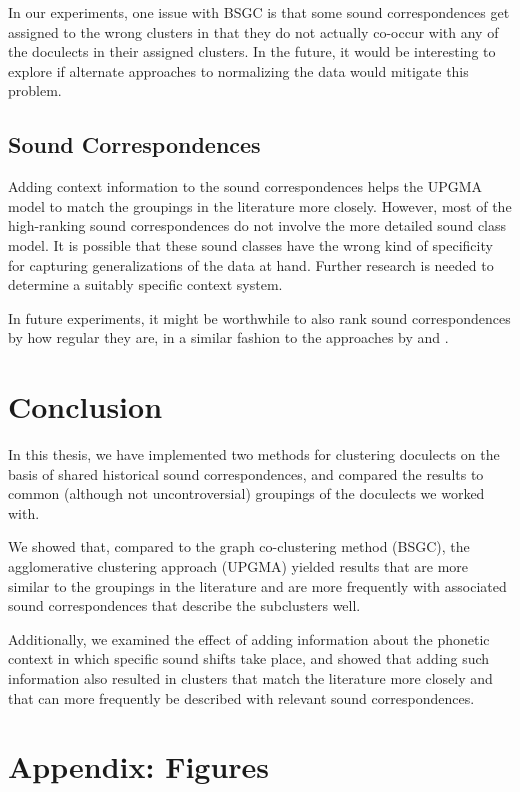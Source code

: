 \documentclass[a4paper, 11pt]{article}
\begin{document}
In our experiments, one issue with BSGC is that some
sound correspondences get assigned to the wrong clusters
in that they do not actually co-occur with any of the
doculects in their assigned clusters.
In the future, it would be interesting to
explore if alternate approaches to normalizing the data
would mitigate this problem.

\subsection{Sound Correspondences}

Adding context information to the sound correspondences
helps the UPGMA model to match the groupings in the literature more closely.
However, most of the high-ranking sound correspondences
do not involve the more detailed sound class model.
It is possible that these sound classes have the wrong kind of specificity for capturing generalizations of the data at hand.
Further research is needed to determine a suitably specific context system.

In future experiments, it might be worthwhile to also rank
sound correspondences by how regular they are,
in a similar fashion to the approaches by
\citet{prokic2007identifying} and \citet{prokic2013combining}.

\section{Conclusion}

In this thesis, we have implemented two methods
for clustering doculects on the basis of shared
historical sound correspondences,
and compared the results to common (although not uncontroversial)
groupings of the doculects we worked with.

We showed that, compared to the graph co-clustering method (BSGC),
the agglomerative clustering approach (UPGMA)
yielded results that are more similar to the groupings in the literature
and are  more frequently with associated sound correspondences that
describe the subclusters well.

Additionally, we examined the effect of adding information about
the phonetic context in which specific sound shifts take place,
and showed that adding such information also resulted in
clusters that match the literature more closely and that
can more frequently be described with relevant sound correspondences.

\newpage
{}
\section*{Appendix: Figures}
\end{document}

